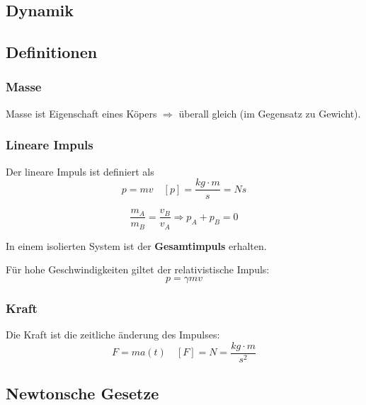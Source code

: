 \documentclass[7pt]{article}
\begin{document}
\begin{multicols*}{3}

\section{Dynamik}

\subsection{Definitionen}

\subsubsection{Masse}

Masse ist Eigenschaft eines K{\"o}pers $\Rightarrow$ {\"u}berall gleich (im Gegensatz zu Gewicht).

\subsubsection{Lineare Impuls}

Der lineare Impuls ist definiert als
\begin{equation*}
	p = mv \quad [p] = \frac{kg\cdot m}{s} = Ns
\end{equation*}

\begin{equation*}
	\frac{m_A}{m_B} = \frac{v_B}{v_A} \Rightarrow p_A + p_B = 0
\end{equation*}

In einem isolierten System ist der \textbf{Gesamtimpuls} erhalten.

F{\"u}r hohe Geschwindigkeiten giltet der relativistische Impuls:
\begin{equation*}
	p = \gamma mv
\end{equation*}

\subsubsection{Kraft}

Die Kraft ist die zeitliche {\"a}nderung des Impulses:
\begin{equation*}
	F = ma(t) \quad [F] = N = \frac{kg\cdot m}{s^2}
\end{equation*}

\subsection{Newtonsche Gesetze}


\end{multicols*}
\end{document}
